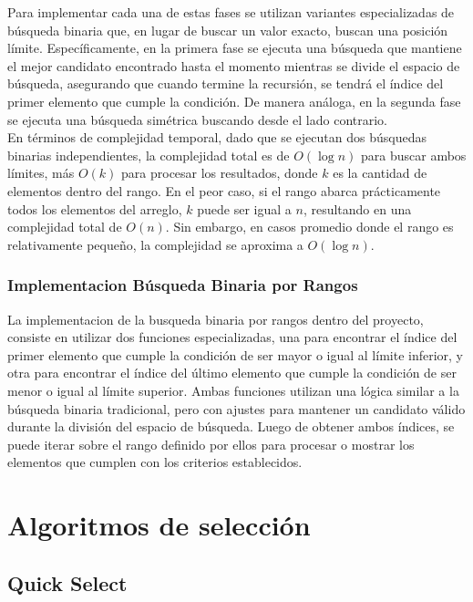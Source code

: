 Para implementar cada una de estas fases se utilizan variantes especializadas de búsqueda binaria que, en lugar de buscar un valor exacto, buscan una posición límite. Específicamente, en la primera fase se ejecuta una búsqueda que mantiene el mejor candidato encontrado hasta el momento mientras se divide el espacio de búsqueda, asegurando que cuando termine la recursión, se tendrá el índice del primer elemento que cumple la condición. De manera análoga, en la segunda fase se ejecuta una búsqueda simétrica buscando desde el lado contrario. \\

En términos de complejidad temporal, dado que se ejecutan dos búsquedas binarias independientes, la complejidad total es de $O(\log n)$ para buscar ambos límites, más $O(k)$ para procesar los resultados, donde $k$ es la cantidad de elementos dentro del rango. En el peor caso, si el rango abarca prácticamente todos los elementos del arreglo, $k$ puede ser igual a $n$, resultando en una complejidad total de $O(n)$. Sin embargo, en casos promedio donde el rango es relativamente pequeño, la complejidad se aproxima a $O(\log n)$. \\

\subsubsection{Implementacion Búsqueda Binaria por Rangos}
La implementacion de la busqueda binaria por rangos dentro del proyecto, consiste en utilizar dos funciones especializadas, una para encontrar el índice del primer elemento que cumple la condición de ser mayor o igual al límite inferior, y otra para encontrar el índice del último elemento que cumple la condición de ser menor o igual al límite superior.  Ambas funciones utilizan una lógica similar a la búsqueda binaria tradicional, pero con ajustes para mantener un candidato válido durante la división del espacio de búsqueda.  Luego de obtener ambos índices, se puede iterar sobre el rango definido por ellos para procesar o mostrar los elementos que cumplen con los criterios establecidos.


\section{Algoritmos de selección}

\subsection{Quick Select}

